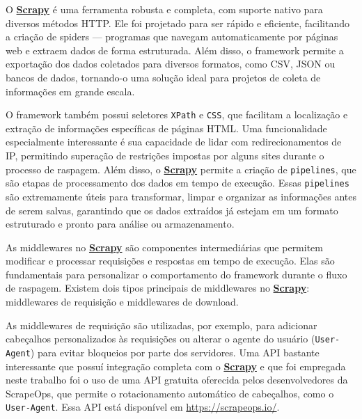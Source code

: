 \documentclass[
  12pt,
  a4paper,
]{scrreprt}
\begin{document}
O \href{https://docs.scrapy.org/en/latest}{\textbf{Scrapy}} é uma
ferramenta robusta e completa, com suporte nativo para diversos métodos
HTTP. Ele foi projetado para ser rápido e eficiente, facilitando a
criação de spiders --- programas que navegam automaticamente por páginas
web e extraem dados de forma estruturada. Além disso, o framework
permite a exportação dos dados coletados para diversos formatos, como
CSV, JSON ou bancos de dados, tornando-o uma solução ideal para projetos
de coleta de informações em grande escala.

\vspace{12pt}

O framework também possui seletores \texttt{XPath} e \texttt{CSS}, que
facilitam a localização e extração de informações específicas de páginas
HTML. Uma funcionalidade especialmente interessante é sua capacidade de
lidar com redirecionamentos de IP, permitindo superação de restrições
impostas por alguns sites durante o processo de raspagem. Além disso, o
\href{https://docs.scrapy.org/en/latest}{\textbf{Scrapy}} permite a
criação de \texttt{pipelines}, que são etapas de processamento dos dados
em tempo de execução. Essas \texttt{pipelines} são extremamente úteis
para transformar, limpar e organizar as informações antes de serem
salvas, garantindo que os dados extraídos já estejam em um formato
estruturado e pronto para análise ou armazenamento.

\vspace{12pt}

As middlewares no
\href{https://docs.scrapy.org/en/latest}{\textbf{Scrapy}} são
componentes intermediárias que permitem modificar e processar
requisições e respostas em tempo de execução. Elas são fundamentais para
personalizar o comportamento do framework durante o fluxo de raspagem.
Existem dois tipos principais de middlewares no
\href{https://docs.scrapy.org/en/latest}{\textbf{Scrapy}}: middlewares
de requisição e middlewares de download.

\vspace{12pt}

As middlewares de requisição são utilizadas, por exemplo, para adicionar
cabeçalhos personalizados às requisições ou alterar o agente do usuário
(\texttt{User-Agent}) para evitar bloqueios por parte dos servidores.
Uma API bastante interessante que possuí integração completa com o
\href{https://docs.scrapy.org/en/latest}{\textbf{Scrapy}} e que foi
empregada neste trabalho foi o uso de uma API gratuita oferecida pelos
desenvolvedores da ScrapeOps, que permite o rotacionamento automático de
cabeçalhos, como o \texttt{User-Agent}. Essa API está disponível em
\url{https://scrapeops.io/}.
\end{document}
